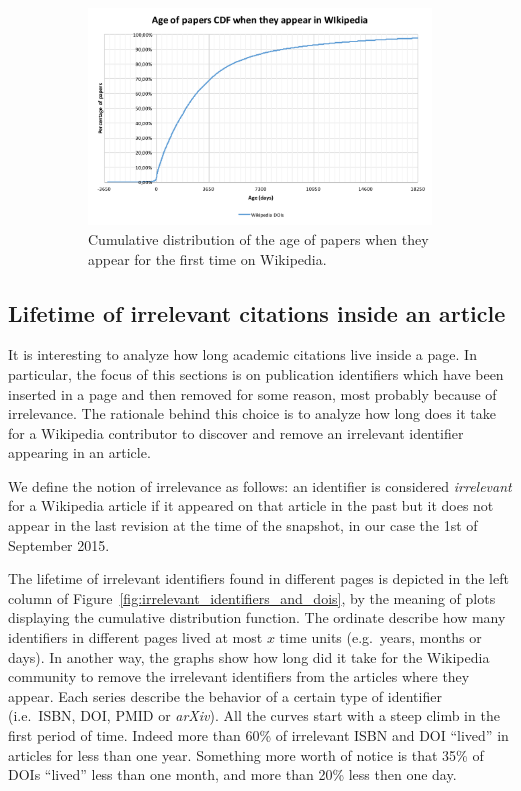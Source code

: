 \begin{figure}[h]
\begin{subfigure}{1\textwidth}
        \includegraphics[keepaspectratio=true, width=\linewidth]{assets/age_of_papers_at_first_appearance_cdf}
        \caption{Cumulative distribution of the age of papers when they appear for the first time on Wikipedia.}
\label{fig:age_of_papers_at_first_appearance_cdf}
    \end{subfigure}
    \caption{}
\end{figure}

\subsection{Lifetime of irrelevant citations inside an article}
It is interesting to analyze how long academic citations live inside a page.
In particular, the focus of this sections is on publication identifiers which have been inserted in a page and then removed for some reason, most probably because of irrelevance.
The rationale behind this choice is to analyze how long does it take for a Wikipedia contributor to discover and remove an irrelevant identifier appearing in an article.

We define the notion of irrelevance as follows: an identifier is considered \emph{irrelevant} for a Wikipedia article if it appeared on that article in the past but it does not appear in the last revision at the time of the snapshot, in our case the 1st of September 2015.

The lifetime of irrelevant identifiers found in different pages is depicted in the left column of Figure~\ref{fig:irrelevant_identifiers_and_dois}, by the meaning of plots displaying the cumulative distribution function.
The ordinate describe how many identifiers in different pages lived at most $x$ time units (e.g.\ years, months or days).
In another way, the graphs show how long did it take for the Wikipedia community to remove the irrelevant identifiers from the articles where they appear.
Each series describe the behavior of a certain type of identifier (i.e.\ \ac{ISBN}, \ac{DOI}, \ac{PMID} or \emph{arXiv}).
All the curves start with a steep climb in the first period of time.
Indeed more than 60\% of irrelevant \ac{ISBN} and \ac{DOI} ``lived'' in articles for less than one year.
Something more worth of notice is that 35\% of \acp{DOI} ``lived'' less than one month, and more than 20\% less then one day.

